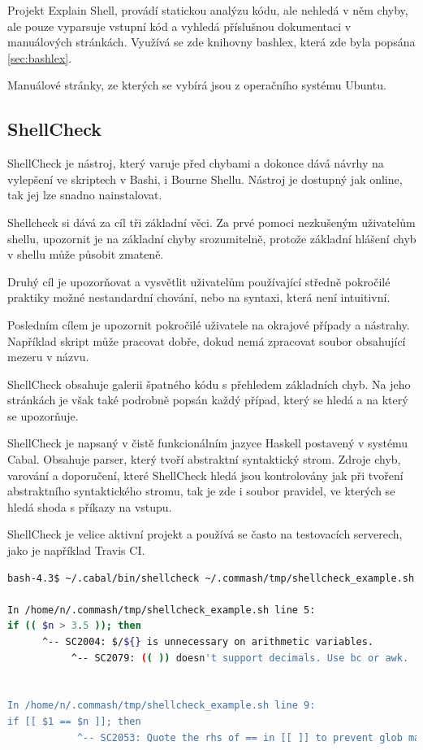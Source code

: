 \documentclass[thesis=M,czech]{FITthesis}[2012/06/26]
\begin{document}
Projekt Explain Shell, provádí statickou analýzu kódu, ale nehledá v něm chyby, ale pouze vyparsuje vstupní kód a vyhledá příslušnou dokumentaci v manuálových stránkách. Využívá se zde knihovny bashlex, která zde byla popsána \ref{sec:bashlex}.

Manuálové stránky, ze kterých se vybírá jsou z operačního systému Ubuntu.


%
%
\subsection{ShellCheck}

ShellCheck je nástroj, který varuje před chybami a dokonce dává návrhy na vylepšení ve skriptech v Bashi, i Bourne Shellu. Nástroj je dostupný jak online, tak jej lze snadno nainstalovat.

Shellcheck si dává za cíl tři základní věci. Za prvé pomoci nezkušeným uživatelům shellu, upozornit je na základní chyby srozumitelně, protože základní hlášení chyb v shellu může působit zmateně.

Druhý cíl je upozorňovat a vysvětlit uživatelům používající středně pokročilé praktiky možné nestandardní chování, nebo na syntaxi, která není intuitivní.

Posledním cílem je upozornit pokročilé uživatele na okrajové případy a nástrahy. Například skript může pracovat dobře, dokud nemá zpracovat soubor obsahující mezeru v názvu.

ShellCheck obsahuje galerii špatného kódu s přehledem základních chyb. Na jeho stránkách je však také podrobně popsán každý případ, který se hledá a na který se upozorňuje.

ShellCheck je napsaný v čistě funkcionálním jazyce Haskell postavený v systému Cabal. Obsahuje parser, který tvoří abstraktní syntaktický strom. Zdroje chyb, varování a doporučení, které ShellCheck hledá jsou kontrolovány jak při tvoření abstraktního syntaktického stromu, tak je zde i soubor pravidel, ve kterých se hledá shoda s příkazy na vstupu.

ShellCheck je velice aktivní projekt a používá se často na testovacích serverech, jako je například Travis CI.

\begin{minipage}{\linewidth}
\begin{lstlisting}[language=bash, caption={ShellCheck}, label={lst:debugtrap}]
bash-4.3$ ~/.cabal/bin/shellcheck ~/.commash/tmp/shellcheck_example.sh 

In /home/n/.commash/tmp/shellcheck_example.sh line 5:
if (( $n > 3.5 )); then
      ^-- SC2004: $/${} is unnecessary on arithmetic variables.
           ^-- SC2079: (( )) doesn't support decimals. Use bc or awk.


In /home/n/.commash/tmp/shellcheck_example.sh line 9:
if [[ $1 == $n ]]; then
            ^-- SC2053: Quote the rhs of == in [[ ]] to prevent glob matching.
\end{lstlisting}
\end{minipage}
\end{document}

